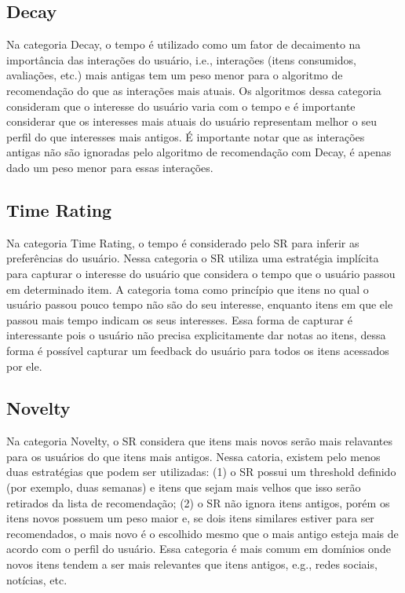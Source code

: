 \subsection{Decay}\label{section:decay}

Na categoria Decay, o tempo é utilizado como um fator de decaimento na importância das interações do usuário, i.e.,
interações (itens consumidos, avaliações, etc.) mais antigas tem um peso menor para o algoritmo de recomendação do que
as interações mais atuais. Os algoritmos dessa categoria consideram que o interesse do usuário varia com o tempo e é
importante considerar que os interesses mais atuais do usuário representam melhor o seu perfil do que interesses mais
antigos. É importante notar que as interações antigas não são ignoradas pelo algoritmo de recomendação com Decay, é
apenas dado um peso menor para essas interações.

\subsection{Time Rating}

Na categoria Time Rating, o tempo é considerado pelo SR para inferir as preferências do usuário. Nessa categoria o SR
utiliza uma estratégia implícita para capturar o interesse do usuário que considera o tempo que o usuário passou em
determinado item. A categoria toma como princípio que itens no qual o usuário passou pouco tempo não são do seu
interesse, enquanto itens em que ele passou mais tempo indicam os seus interesses. Essa forma de capturar é interessante
pois o usuário não precisa explicitamente dar notas ao itens, dessa forma é possível capturar um feedback do usuário
para todos os itens acessados por ele.

\subsection{Novelty}

Na categoria Novelty, o SR considera que itens mais novos serão mais relavantes para os usuários do que itens mais
antigos. Nessa catoria, existem pelo menos duas estratégias que podem ser utilizadas: (1) o SR possui um threshold
definido (por exemplo, duas semanas) e itens que sejam mais velhos que isso serão retirados da lista de recomendação;
(2) o SR não ignora itens antigos, porém os itens novos possuem um peso maior e, se dois itens similares estiver para
ser recomendados, o mais novo é o escolhido mesmo que o mais antigo esteja mais de acordo com o perfil do usuário.
Essa categoria é mais comum em domínios onde novos itens tendem a ser mais relevantes que itens antigos, e.g., redes
sociais, notícias, etc.

